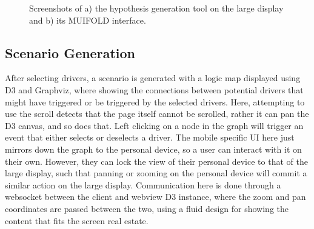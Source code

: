 \begin{figure}
\centering
    \hfill
    \hfill
    \hfill
  \caption{Screenshots of a) the hypothesis generation tool on the large display and b) its MUIFOLD interface.}
  \label{fig:prediction_ui}
\end{figure}


\subsection{Scenario Generation}

After selecting drivers, a scenario is generated with a logic
map displayed using D3 and Graphviz, where showing the connections
between potential drivers that might have triggered or be triggered
by the selected drivers. Here, attempting to use the scroll detects
that the page itself cannot be scrolled, rather it can pan the D3
canvas, and so does that. Left clicking on a node in the graph
will trigger an event that either selects or deselects a driver. The
mobile specific UI here just mirrors down the graph to the personal
device, so a user can interact with it on their own. However, they can
lock the view of their personal device to that of the large display,
such that panning or zooming on the personal device will commit a
similar action on the large display. Communication here is done
through a websocket between the client and webview D3 instance,
where the zoom and pan coordinates are passed between the two, using
a fluid design for showing the content that fits the screen
real estate.


